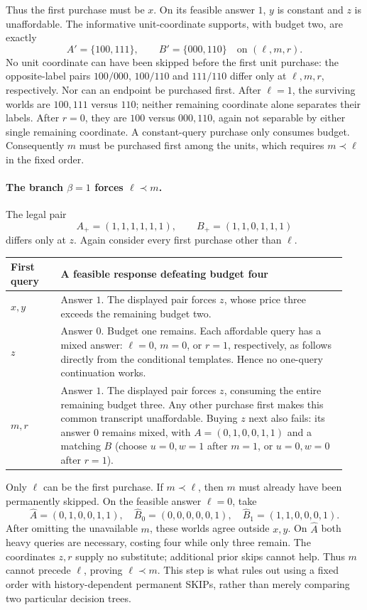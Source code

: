 \documentclass[pdflatex,sn-mathphys-num]{sn-jnl}
\theoremstyle{thmstyleone}
\theoremstyle{thmstylethree}
\theoremstyle{thmstyletwo}
\begin{document}
Thus the first purchase must be $x$. On its feasible answer $1$, $y$ is
constant and $z$ is unaffordable. The informative unit-coordinate
supports, with budget two, are exactly
\[
 A' = \{100,111\},\qquad B'=\{000,110\}
 \quad\text{on }(\ell,m,r).
\]
No unit coordinate can have been skipped before the first unit purchase:
the opposite-label pairs $100/000$, $100/110$ and $111/110$ differ only
at $\ell,m,r$, respectively. Nor can an endpoint be purchased first.
After $\ell=1$, the surviving worlds are $100,111$ versus $110$;
neither remaining coordinate alone separates their labels. After $r=0$,
they are $100$ versus $000,110$, again not separable by either single
remaining coordinate. A constant-query purchase only consumes budget.
Consequently $m$ must be purchased first among the units, which requires
$m\prec\ell$ in the fixed order.

\paragraph*{The branch $\beta=1$ forces $\ell\prec m$.}
The legal pair
\[
 A_+=(1,1,1,1,1,1),\qquad B_+=(1,1,0,1,1,1)
\]
differs only at $z$. Again consider every first purchase other than
$\ell$.

\begin{center}\small
\begin{tabular}{@{}p{0.14\linewidth}p{0.80\linewidth}@{}}
\toprule
First query & A feasible response defeating budget four\\\midrule
$x,y$ & Answer $1$. The displayed pair forces $z$, whose price three
exceeds the remaining budget two.\\
$z$ & Answer $0$. Budget one remains. Each affordable query has a mixed
answer: $\ell=0$, $m=0$, or $r=1$, respectively, as follows directly
from the conditional templates. Hence no one-query continuation works.\\
$m,r$ & Answer $1$. The displayed pair forces $z$, consuming the entire
remaining budget three. Any other purchase first makes this common
transcript unaffordable. Buying $z$ next also fails: its answer $0$
remains mixed, with $A=(0,1,0,0,1,1)$ and a matching $B$ (choose
$u=0,w=1$ after $m=1$, or $u=0,w=0$ after $r=1$).\\
\bottomrule
\end{tabular}
\end{center}

Only $\ell$ can be the first purchase. If $m\prec\ell$, then $m$
must already have been permanently skipped. On the feasible answer
$\ell=0$, take
\[
 \widehat A=(0,1,0,0,1,1),\quad
 \widehat B_0=(0,0,0,0,0,1),\quad
 \widehat B_1=(1,1,0,0,0,1).
\]
After omitting the unavailable $m$, these worlds agree outside $x,y$.
On $\widehat A$ both heavy queries are necessary, costing four while
only three remain. The coordinates $z,r$ supply no substitute; additional
prior skips cannot help. Thus $m$ cannot precede $\ell$, proving
$\ell\prec m$. This step is what rules out using a fixed order with
history-dependent permanent SKIPs, rather than merely comparing two
particular decision trees.
\end{document}
